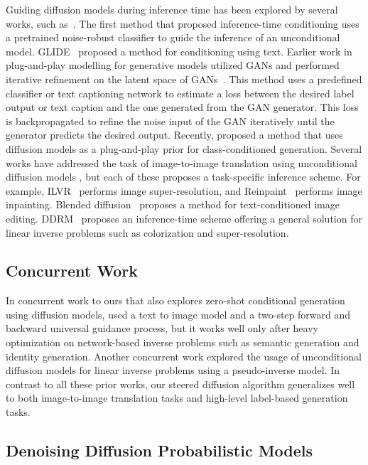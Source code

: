 \documentclass[10pt,twocolumn,letterpaper]{article}
\begin{document}
Guiding diffusion models during inference time has been explored by several works, such as~\cite{nair2023unite}. The first method that proposed inference-time conditioning \cite{dhariwal2021diffusion} uses a pretrained noise-robust classifier to guide the inference of an unconditional model. GLIDE~\cite{nichol2021glide} proposed a method for conditioning using text. 
Earlier work in plug-and-play modelling for generative models utilized GANs and performed iterative refinement on the latent space of GANs~\cite{nguyen2017plug}. This method uses a predefined classifier or text captioning network to estimate a loss between the desired label output or text caption and the one generated from the GAN generator. This loss is backpropagated to refine the noise input of the GAN iteratively until the generator predicts the desired output. Recently,\cite{graikos2022diffusion} proposed a method that uses diffusion models as a plug-and-play prior for class-conditioned generation. Several works have addressed the task of image-to-image translation using unconditional diffusion models \cite{kawar2022denoising, choi2021ilvr, lugmayr2022repaint,avrahami2022blended}, but each of these proposes a task-specific inference scheme. For example, ILVR~\cite{choi2021ilvr} performs image super-resolution, and Reinpaint~\cite{lugmayr2022repaint} performs image inpainting. Blended diffusion~\cite{avrahami2022blended} proposes a method for text-conditioned image editing. DDRM~\cite{kawar2022denoising} proposes an inference-time scheme offering a general solution for linear inverse problems such as colorization and super-resolution.
\subsection{Concurrent Work}
In concurrent work to ours that also explores zero-shot conditional generation using diffusion models, \cite{bansal2023universal} used a text to image model\cite{rombach2021highresolution} and a two-step forward and backward universal guidance process, but it works well only after heavy optimization on network-based inverse problems such as semantic generation and identity generation. Another concurrent work\cite{song2022pseudoinverse} explored the usage of unconditional diffusion models for linear inverse problems using a pseudo-inverse model. In contrast to all these prior works, our steered diffusion algorithm generalizes well to both image-to-image translation tasks and high-level label-based generation tasks.

\subsection{Denoising Diffusion Probabilistic Models} 
\end{document}
